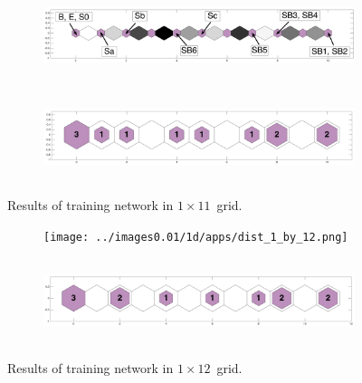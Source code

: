     \begin{figure}
        \begin{subfigure}[b]{0.5\textwidth}
            \centering
            \includegraphics[width=\textwidth,height=2.5cm]{../images0.01/1d/apps/dist_1_by_11.png}
        \end{subfigure}
        \hfill
        \begin{subfigure}[b]{0.5\textwidth}
             \includegraphics[width=\textwidth,height=2.5cm]{../images0.01/1d/apps/hit_t_1_by_11.png}
        \end{subfigure}
                \caption{Results of training network in $1\times11$~grid.}
         \label{fig: 1by11T}
    \end{figure}
    

    \begin{figure}
        \begin{subfigure}[b]{0.5\textwidth}
            \centering
            \texttt{[image: ../images0.01/1d/apps/dist\_1\_by\_12.png]}
        \end{subfigure}
        \hfill
        \begin{subfigure}[b]{0.5\textwidth}
             \includegraphics[width=\textwidth,height=2.5cm]{../images0.01/1d/apps/hit_t_1_by_12.png}
        \end{subfigure}
                \caption{Results of training network in $1\times12$~grid.}
         \label{fig: 1by12T}
    \end{figure}

